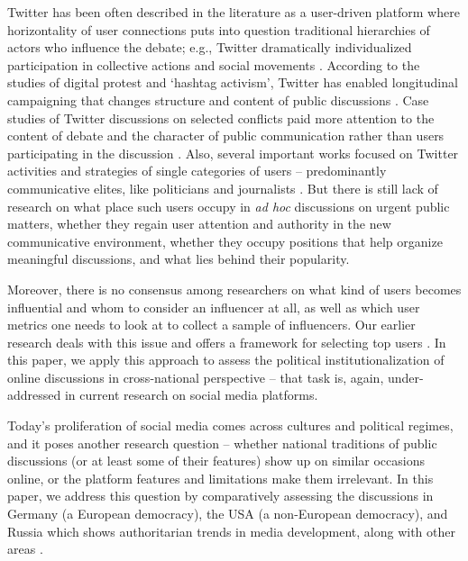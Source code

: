 Twitter has been often described in the literature as a user-driven platform where horizontality of user connections puts into question traditional hierarchies of actors who influence the debate; e.g., Twitter dramatically individualized participation in collective actions and social movements \cite{BennettSegerberg,BastosMercea}. According to the studies of digital protest and ‘hashtag activism’, Twitter has enabled longitudinal campaigning that changes structure and content of public discussions \cite{BonillaRosa}. Case studies of Twitter discussions on selected conflicts paid more attention to the content of debate and the character of public communication rather than users participating in the discussion \cite{BonillaRosa,GroshekTandoc}. Also, several important works focused on Twitter activities and strategies of single categories of users -- predominantly communicative elites, like politicians and journalists \cite{BaumannFabianLessmann,LasorsaLewisHolton}. But there is still lack of research on what place such users occupy in \textit{ad hoc} discussions on urgent public matters, whether they regain user attention and authority in the new communicative environment, whether they occupy positions that help organize meaningful discussions, and what lies behind their popularity.

Moreover, there is no consensus among researchers on what kind of users becomes influential and whom to consider an influencer at all, as well as which user metrics one needs to look at to collect a sample of influencers. Our earlier research deals with this issue and offers a framework for selecting top users \cite{BodrunovaLitvinenkoNigmatullina,BodrunovaLitvinenkoBlekanov2016}. In this paper, we apply this approach to assess the political institutionalization of online discussions in cross-national perspective -- that task is, again, under-addressed in current research on social media platforms.

Today’s proliferation of social media comes across cultures and political regimes, and it poses another research question -- whether national traditions of public discussions (or at least some of their features) show up on similar occasions online, or the platform features and limitations make them irrelevant. In this paper, we address this question by comparatively assessing the discussions in Germany (a European democracy), the USA (a non-European democracy), and Russia which shows authoritarian trends in media development, along with other areas \cite{Toepfl2010,Sherstobitov,SmythOates,Denisova,BodrunovaLitvinenko}.

